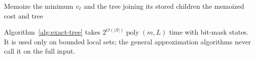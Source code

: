 \begin{algorithm}[H]
\caption{Exact supplied-query Bellman recursion (small local states)}
\label{alg:exact-tree}
Memoize the minimum $v_\ell$ and the tree joining its stored children\;
\KwRet the memoized cost and tree\;
\end{algorithm}

Algorithm~\ref{alg:exact-tree} takes $2^{O(|S|)}\operatorname{poly}(m,L)$
time with bit-mask states. It is used only on bounded local sets;
the general approximation algorithms never call it on the full input.
